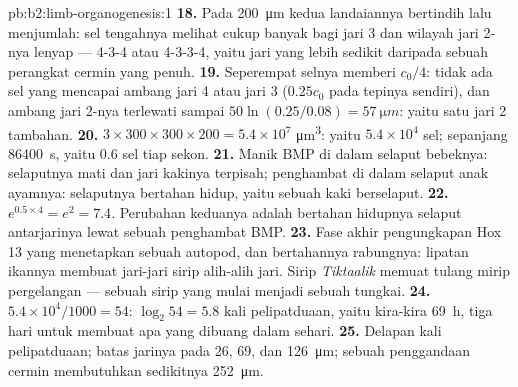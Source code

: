\begin{solution}{pb:b2:limb-organogenesis:1}
\textbf{18.} Pada \qty{200}{\micro m} kedua landaiannya bertindih lalu
menjumlah: sel tengahnya melihat cukup banyak bagi jari 3 dan wilayah
jari 2-nya lenyap --- 4-3-4 atau 4-3-3-4, yaitu jari yang lebih sedikit
daripada sebuah perangkat cermin yang penuh.
\textbf{19.} Seperempat selnya memberi $c_0/4$: tidak ada sel yang
mencapai ambang jari 4 atau jari 3 ($0.25 c_0$ pada tepinya sendiri),
dan ambang jari 2-nya terlewati sampai $50\ln(0.25/0.08) =
\qty{57}{\micro m}$: yaitu satu jari 2 tambahan.
\textbf{20.} $3\times 300\times 300\times 200 = 5.4\times 10^{7}$
\unit{\micro m^3}: yaitu $5.4\times 10^{4}$ sel; sepanjang
\qty{86400}{s}, yaitu $0.6$ sel tiap sekon.
\textbf{21.} Manik BMP di dalam selaput bebeknya: selaputnya mati dan
jari kakinya terpisah; penghambat di dalam selaput anak ayamnya:
selaputnya bertahan hidup, yaitu sebuah kaki berselaput.
\textbf{22.} $e^{0.5\times 4} = e^{2} = 7.4$. Perubahan keduanya adalah
bertahan hidupnya selaput antarjarinya lewat sebuah penghambat BMP.
\textbf{23.} Fase akhir pengungkapan Hox 13 yang menetapkan sebuah
autopod, dan bertahannya rabungnya: lipatan ikannya membuat jari-jari
sirip alih-alih jari. Sirip \emph{Tiktaalik} memuat tulang mirip
pergelangan --- sebuah sirip yang mulai menjadi sebuah tungkai.
\textbf{24.} $5.4\times 10^{4}/1000 = 54$: $\log_2 54 = 5.8$ kali
pelipatduaan, yaitu kira-kira \qty{69}{h}, tiga hari untuk membuat apa
yang dibuang dalam sehari.
\textbf{25.} Delapan kali pelipatduaan; batas jarinya pada 26, 69, dan
\qty{126}{\micro m}; sebuah penggandaan cermin membutuhkan sedikitnya
\qty{252}{\micro m}.
\end{solution}

